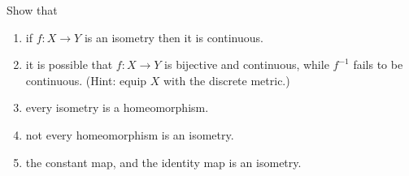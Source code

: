 \begin{exercise}
Show that
\begin{enumerate}
\item if $f: X \to Y$ is an isometry then it is continuous.
\item it is possible that $f: X \to Y$ is bijective and continuous, while $f^{-1}$ fails to be continuous. (Hint: equip $X$ with the discrete metric.)
\item every isometry is a homeomorphism.
\item not every homeomorphism is an isometry.
\item the constant map, and the identity map is an isometry.
\end{enumerate}
\end{exercise}